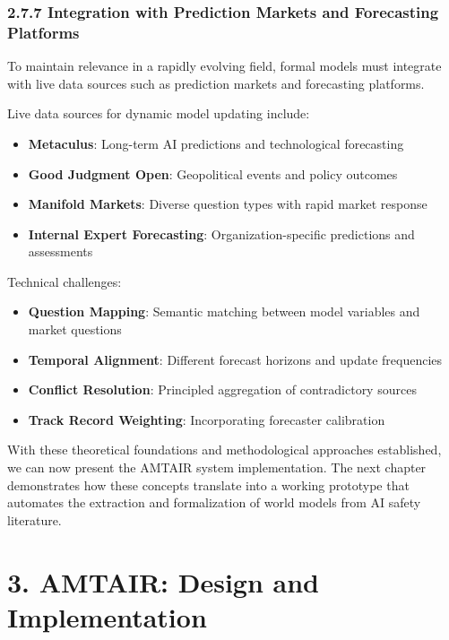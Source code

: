 \documentclass[
  11pt,
  letterpaper,
]{book}
\providecommand{\tightlist}{%
  \setlength{\itemsep}{0pt}\setlength{\parskip}{0pt}}
\begin{document}
\subsection*{2.7.7 Integration with Prediction Markets and Forecasting
Platforms}\label{sec-prediction-markets}

To maintain relevance in a rapidly evolving field, formal models must
integrate with live data sources such as prediction markets and
forecasting platforms.

Live data sources for dynamic model updating include:

\begin{itemize}
\tightlist
\item
  \textbf{Metaculus}: Long-term AI predictions and technological
  forecasting
\item
  \textbf{Good Judgment Open}: Geopolitical events and policy outcomes
\item
  \textbf{Manifold Markets}: Diverse question types with rapid market
  response
\item
  \textbf{Internal Expert Forecasting}: Organization-specific
  predictions and assessments
\end{itemize}

Technical challenges:

\begin{itemize}
\tightlist
\item
  \textbf{Question Mapping}: Semantic matching between model variables
  and market questions
\item
  \textbf{Temporal Alignment}: Different forecast horizons and update
  frequencies
\item
  \textbf{Conflict Resolution}: Principled aggregation of contradictory
  sources
\item
  \textbf{Track Record Weighting}: Incorporating forecaster calibration
\end{itemize}

With these theoretical foundations and methodological approaches
established, we can now present the AMTAIR system implementation. The
next chapter demonstrates how these concepts translate into a working
prototype that automates the extraction and formalization of world
models from AI safety literature.


\chapter*{3. AMTAIR: Design and Implementation}\label{sec-amtair}
\end{document}
